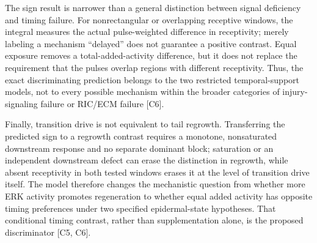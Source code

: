 \documentclass[11pt]{article}
\begin{document}
The sign result is narrower than a general distinction between signal deficiency and timing failure. For nonrectangular or overlapping receptive windows, the integral measures the actual pulse-weighted difference in receptivity; merely labeling a mechanism \textquotedblleft{}delayed\textquotedblright{} does not guarantee a positive contrast. Equal exposure removes a total-added-activity difference, but it does not replace the requirement that the pulses overlap regions with different receptivity. Thus, the exact discriminating prediction belongs to the two restricted temporal-support models, not to every possible mechanism within the broader categories of injury-signaling failure or RIC/ECM failure [C6].

Finally, transition drive is not equivalent to tail regrowth. Transferring the predicted sign to a regrowth contrast requires a monotone, nonsaturated downstream response and no separate dominant block; saturation or an independent downstream defect can erase the distinction in regrowth, while absent receptivity in both tested windows erases it at the level of transition drive itself. The model therefore changes the mechanistic question from whether more ERK activity promotes regeneration to whether equal added activity has opposite timing preferences under two specified epidermal-state hypotheses. That conditional timing contrast, rather than supplementation alone, is the proposed discriminator [C5, C6].
\end{document}
